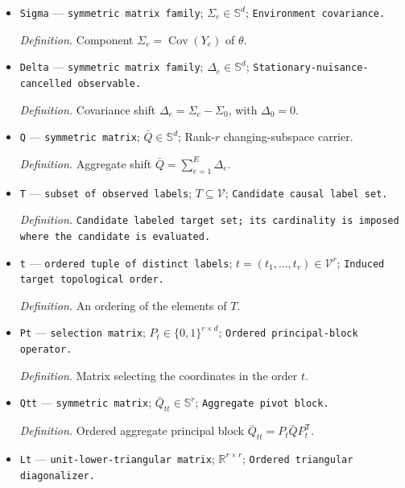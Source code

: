 \documentclass{article}
\begin{document}
\begin{itemize}
  \par\smallskip\noindent\emph{Definition.} Population covariance tuple \(\theta=(\Sigma_0,\ldots,\Sigma_E)\).
  \item \texttt{Sigma} --- \texttt{symmetric matrix family}; \(\Sigma_e\in\mathbb S^d\); \texttt{Environment covariance.}
  \par\smallskip\noindent\emph{Definition.} Component \(\Sigma_e=\operatorname{Cov}(Y_e)\) of \(\theta\).
  \item \texttt{Delta} --- \texttt{symmetric matrix family}; \(\Delta_e\in\mathbb S^d\); \texttt{Stationary-\allowbreak{}nuisance-\allowbreak{}cancelled observable.}
  \par\smallskip\noindent\emph{Definition.} Covariance shift \(\Delta_e=\Sigma_e-\Sigma_0\), with \(\Delta_0=0\).
  \item \texttt{Q} --- \texttt{symmetric matrix}; \(\bar Q\in\mathbb S^d\); Rank-\(r\) changing-subspace carrier.
  \par\smallskip\noindent\emph{Definition.} Aggregate shift \(\bar Q=\sum_{e=1}^E\Delta_e\).
  \item \texttt{T} --- \texttt{subset of observed labels}; \(T\subseteq\mathcal V\); \texttt{Candidate causal label set.}
  \par\smallskip\noindent\emph{Definition.} \texttt{Candidate labeled target set;\allowbreak{} its cardinality is imposed where the candidate is evaluated.}
  \item \texttt{t} --- \texttt{ordered tuple of distinct labels}; \(t=(t_1,\ldots,t_r)\in\mathcal V^r\); \texttt{Induced target topological order.}
  \par\smallskip\noindent\emph{Definition.} An ordering of the elements of \(T\).
  \item \texttt{Pt} --- \texttt{selection matrix}; \(P_t\in\{0,1\}^{r\times d}\); \texttt{Ordered principal-\allowbreak{}block operator.}
  \par\smallskip\noindent\emph{Definition.} Matrix selecting the coordinates in the order \(t\).
  \item \texttt{Qtt} --- \texttt{symmetric matrix}; \(\bar Q_{tt}\in\mathbb S^r\); \texttt{Aggregate pivot block.}
  \par\smallskip\noindent\emph{Definition.} Ordered aggregate principal block \(\bar Q_{tt}=P_t\bar QP_t^{\mathsf T}\).
  \item \texttt{Lt} --- \texttt{unit-\allowbreak{}lower-\allowbreak{}triangular matrix}; \(\mathbb R^{r\times r}\); \texttt{Ordered triangular diagonalizer.}

\end{itemize}
\end{document}
